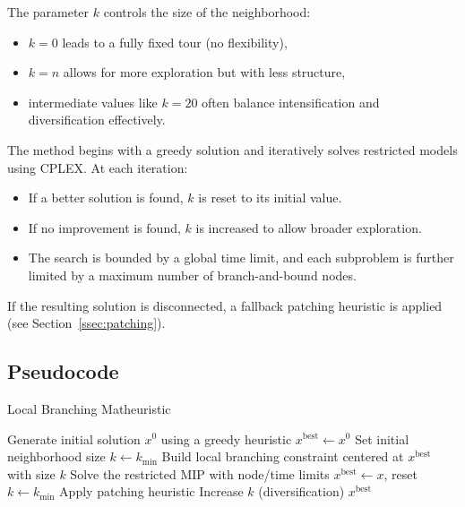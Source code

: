 The parameter \( k \) controls the size of the neighborhood:
\begin{itemize}
    \item \( k = 0 \) leads to a fully fixed tour (no flexibility),
    \item \( k = n \) allows for more exploration but with less structure,
    \item intermediate values like \( k = 20 \) often balance intensification and diversification effectively.
\end{itemize}

The method begins with a greedy solution and iteratively solves restricted models using CPLEX. At each iteration:
\begin{itemize}
    \item If a better solution is found, \( k \) is reset to its initial value.
    \item If no improvement is found, \( k \) is increased to allow broader exploration.
    \item The search is bounded by a global time limit, and each subproblem is further limited by a maximum number of branch-and-bound nodes.
\end{itemize}

If the resulting solution is disconnected, a fallback patching heuristic is applied (see Section~\ref{ssec:patching}).

\subsection{Pseudocode}

\begin{algorithm}[H]
\caption{Local Branching Matheuristic}
\begin{algorithmic}[1]
\State Generate initial solution \( x^0 \) using a greedy heuristic
\State \( x^{\text{best}} \gets x^0 \)
\State Set initial neighborhood size \( k \gets k_{\text{min}} \)
\Repeat
    \State Build local branching constraint centered at \( x^{\text{best}} \) with size \( k \)
    \State Solve the restricted MIP with node/time limits
        \State \( x^{\text{best}} \gets x \), reset \( k \gets k_{\text{min}} \)
        \State Apply patching heuristic
    \Else
        \State Increase \( k \) (diversification)
    \EndIf
{}
\State \Return \( x^{\text{best}} \)
\end{algorithmic}
\end{algorithm}
